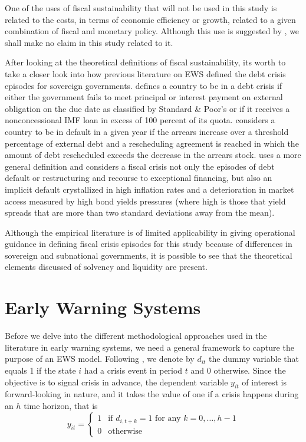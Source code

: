 One of the uses of fiscal sustainability that will not be used in this study is related to the costs, in terms of economic efficiency or growth, related to a given combination of fiscal and monetary policy. Although this use is suggested by \citet{burnside2005}, we shall make no claim in this study related to it.

After looking at the theoretical definitions of fiscal sustainability, its worth to take a closer look into how previous literature on EWS defined the debt crisis episodes for sovereign governments. \citet{manasse2003} defines a country to be in a debt crisis if either the government fails to meet principal or interest payment on external obligation on the due date as classified by Standard \& Poor's or if it receives a nonconcessional IMF loan in excess of 100 percent of its quota. \citet{fuertes2007} considers a country to be in default in a given year if the arrears increase over a threshold percentage of external debt and a rescheduling agreement is reached in which the amount of debt rescheduled exceeds the decrease in the arrears stock. \citet{baldacci2011b} uses a more general definition and considers a fiscal crisis not only the episodes of debt default or restructuring and recourse to exceptional financing, but also an implicit default crystallized in high inflation rates and a deterioration in market access measured by high bond yields pressures (where high is those that yield spreads that are more than two standard deviations away from the mean).

Although the empirical literature is of limited applicability in giving operational guidance in defining fiscal crisis episodes for this study because of differences in sovereign and subnational governments, it is possible to see that the theoretical elements discussed of solvency and liquidity are present. 

\section{Early Warning Systems}
\label{sec:ews}

Before we delve into the different methodological approaches used in the literature in early warning systems, we need a general framework to capture the purpose of an EWS model. Following \citet{fuertes2007}, we denote by $d_{it}$ the dummy variable that equals 1 if the state $i$ had a crisis event in period $t$ and 0 otherwise. Since the objective is to signal crisis in advance, the dependent variable $y_{it}$ of interest is forward-looking in nature, and it takes the value of one if a crisis happens during an $h$ time horizon, that is
\begin{equation}
y_{it} = \begin{cases} 
      1 & \text{if } d_{i,t+k} = 1 \text{ for any } k = 0, \dots, h-1\\
      0 & \text{otherwise}
   \end{cases}
\end{equation}

